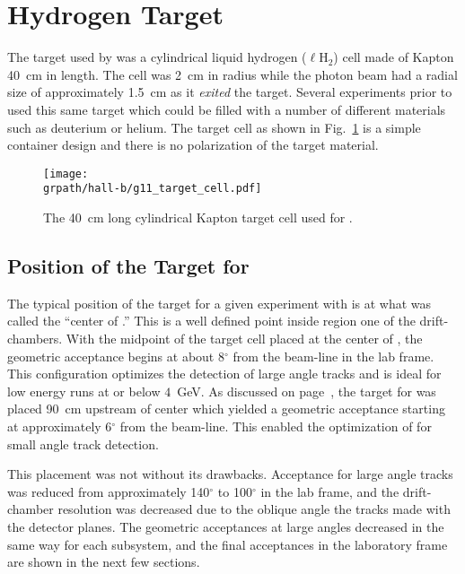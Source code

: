 \section{\label{sec:clas.tgt}Hydrogen Target}

The target used by  was a cylindrical liquid hydrogen ($\ell$H$_2$) cell made of Kapton 40~cm in length. The cell was 2~cm in radius while the photon beam had a radial size of approximately 1.5~cm as it \emph{exited} the target. Several experiments prior to  used this same target which could be filled with a number of different materials such as deuterium or helium. The target cell as shown in Fig.~\ref{fig:clas.targetcell} is a simple container design and there is no polarization of the target material.

\begin{figure}\begin{center}
\texttt{[image: \\grpath/hall-b/g11\_target\_cell.pdf]}
\caption[ Target]{\label{fig:clas.targetcell}The 40~cm long cylindrical Kapton target cell used for .}
\end{center}\end{figure}

\subsection{\label{sec:clas.tgt.position}Position of the Target for }

The typical position of the target for a given experiment with  is at what was called the ``center of .'' This is a well defined point inside region one of the drift-chambers. With the midpoint of the target cell placed at the center of , the geometric acceptance begins at about 8$^\circ$ from the beam-line in the lab frame. This configuration optimizes the detection of large angle tracks and is ideal for low energy runs at or below $4$~GeV. As discussed on page~\pageref{sec:clas.hyclas}, the target for  was placed 90~cm upstream of  center which yielded a geometric acceptance starting at approximately 6$^\circ$ from the beam-line. This enabled the optimization of  for small angle track detection.

This placement was not without its drawbacks. Acceptance for large angle tracks was reduced from approximately 140$^\circ$ to 100$^\circ$ in the lab frame, and the drift-chamber resolution was decreased due to the oblique angle the tracks made with the detector planes. The geometric acceptances at large angles decreased in the same way for each subsystem, and the final acceptances in the laboratory frame are shown in the next few sections.

